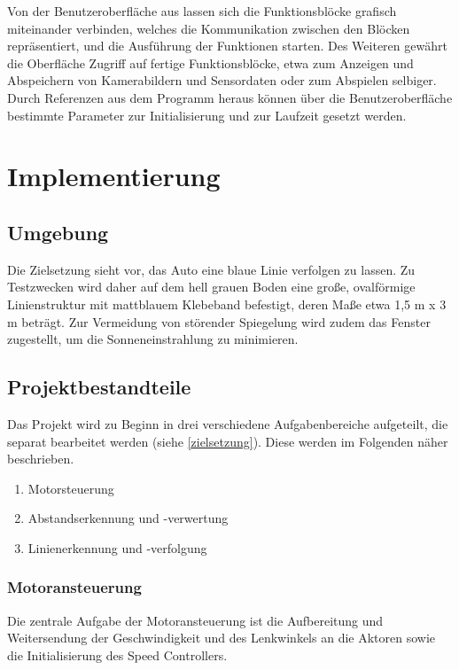 \documentclass[12pt, a4paper]{scrartcl}
\begin{document}
Von der Benutzeroberfläche aus lassen sich die Funktionsblöcke grafisch miteinander verbinden, welches die Kommunikation zwischen den Blöcken repräsentiert, und die Ausführung der Funktionen starten. Des Weiteren gewährt die Oberfläche Zugriff auf fertige Funktionsblöcke, etwa zum Anzeigen und Abspeichern von Kamerabildern und Sensordaten oder zum  Abspielen selbiger.
Durch Referenzen aus dem Programm heraus können über die Benutzeroberfläche bestimmte Parameter zur Initialisierung und zur Laufzeit gesetzt werden.


\newpage
\section{Implementierung}

\subsection{Umgebung}

Die Zielsetzung sieht vor, das Auto eine blaue Linie verfolgen zu lassen. Zu Testzwecken wird daher auf dem hell grauen Boden eine große, ovalförmige Linienstruktur mit mattblauem Klebeband befestigt, deren Maße etwa 1,5 m x 3 m beträgt. Zur Vermeidung von störender Spiegelung wird zudem das Fenster zugestellt, um die Sonneneinstrahlung zu minimieren.

\subsection{Projektbestandteile}

Das Projekt wird zu Beginn in drei verschiedene Aufgabenbereiche aufgeteilt, die separat bearbeitet werden (siehe \autoref{zielsetzung}). Diese werden im Folgenden näher beschrieben.

\begin{enumerate}
	\item Motorsteuerung
	\item Abstandserkennung und -verwertung
	\item Linienerkennung und -verfolgung
\end{enumerate}

\subsubsection{Motoransteuerung}
Die zentrale Aufgabe der Motoransteuerung ist die Aufbereitung und Weitersendung der Geschwindigkeit und des Lenkwinkels an die Aktoren sowie die Initialisierung des Speed Controllers.
\end{document}
